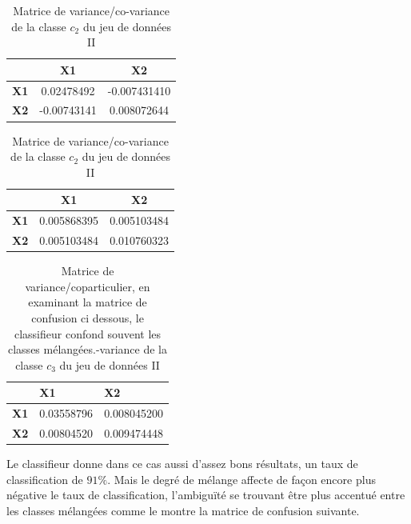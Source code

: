 	\begin{table}[ht]
		\begin{minipage}[b]{0.45\linewidth}\centering
			\begin{tabular}{|c|c|c|}
				\hline
				\textbf{}   & \textbf{X1}  & \textbf{X2}  \\ \hline
				\textbf{X1} & 0.02478492 & -0.007431410            \\ \hline
				\textbf{X2} & -0.00743141            & 0.008072644 \\ \hline
			\end{tabular}
			\caption{Matrice de variance/co-variance de la classe $c_1$ du jeu de données III}
			\label{tab:var_c13}
		\end{minipage}
		\hspace{0.5cm}
		\begin{minipage}[b]{0.45\linewidth}
			\centering
			\begin{tabular}{|c|c|c|}
				\hline
				\textbf{}   & \textbf{X1}  & \textbf{X2}  \\ \hline
					\textbf{X1} & 0.005868395 & 0.005103484            \\ \hline
				\textbf{X2} & 0.005103484            & 0.010760323 \\ \hline
				
			\end{tabular}
			\caption{Matrice de variance/co-variance de la classe $c_2$ du jeu de données II}
			\label{tab:var_c23}
		\end{minipage}
	\end{table}
	\begin{table}[H]
		\centering
		\begin{tabular}{|l|l|l|}
			\hline
			\textbf{}   & \textbf{X1}  & \textbf{X2}  \\ \hline
		\textbf{X1} & 0.03558796 & 0.008045200            \\ \hline
		\textbf{X2} & 0.00804520            & 0.009474448 \\ \hline
		\end{tabular}
		\caption{Matrice de variance/coparticulier, en examinant la matrice de confusion ci dessous, le classifieur confond souvent les classes mélangées.-variance de la classe $c_3$ du jeu de données II}
		\label{tab:var_c33}
	\end{table}
	\par
	Le classifieur donne dans ce cas aussi d'assez bons résultats, un taux de classification de $91\%$. Mais le degré de mélange affecte de façon encore plus négative le taux de classification, l'ambiguïté se trouvant être plus accentué entre les classes mélangées comme le montre la matrice de confusion suivante.
	
